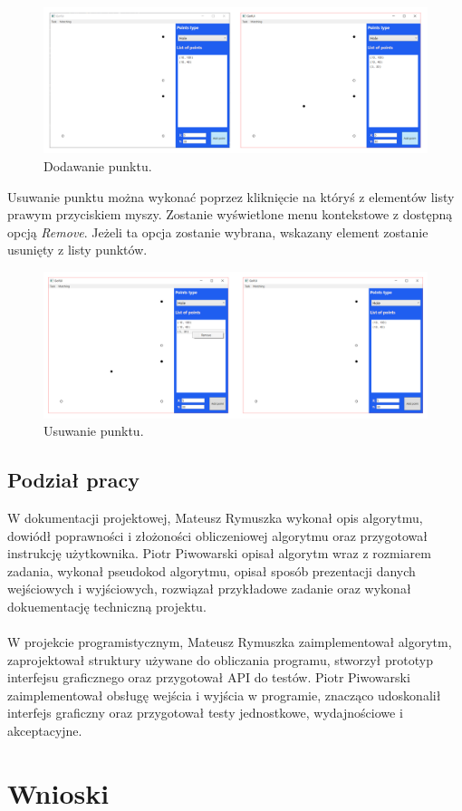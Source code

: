 \documentclass[10pt,a4paper]{article}
\begin{document}
	\begin{figure}[H]
		\centering	
		\includegraphics[scale=0.3]{images/add.png}
 		\caption{Dodawanie punktu.}
 		\label{fig:algorithm_diagram}
	\end{figure}	

	Usuwanie punktu można wykonać poprzez kliknięcie na któryś z elementów listy prawym przyciskiem myszy. Zostanie wyświetlone menu kontekstowe z dostępną opcją \textit{Remove}. Jeżeli ta opcja zostanie wybrana, wskazany element zostanie usunięty z listy punktów.
		
	\begin{figure}[H]
		\centering
 		\includegraphics[scale=0.3]{images/remove.png}
 		\caption{Usuwanie punktu.}
 		\label{fig:algorithm_diagram}
	\end{figure}

	\subsection{Podział pracy}
	
	W dokumentacji projektowej, Mateusz Rymuszka wykonał opis algorytmu, dowiódł poprawności i złożoności obliczeniowej algorytmu oraz przygotował instrukcję użytkownika. Piotr Piwowarski opisał algorytm wraz z rozmiarem zadania, wykonał pseudokod algorytmu, opisał sposób prezentacji danych wejściowych i wyjściowych, rozwiązał przykładowe zadanie oraz wykonał dokuementację techniczną projektu.\\~\\
	W projekcie programistycznym, Mateusz Rymuszka zaimplementował algorytm, zaprojektował struktury używane do obliczania programu, stworzył prototyp interfejsu graficznego oraz przygotował API do testów. Piotr Piwowarski zaimplementował obsługę wejścia i wyjścia w programie, znacząco udoskonalił interfejs graficzny oraz przygotował testy jednostkowe, wydajnościowe i akceptacyjne.

	\section{Wnioski}
	
	
\end{document}
